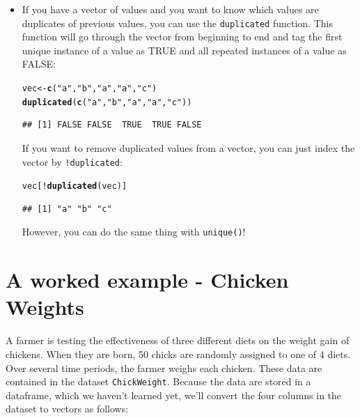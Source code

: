 \documentclass{tufte-book}\usepackage[]{graphicx}\usepackage[]{color}
\makeatletter
\newcommand{\hlstr}[1]{\textcolor[rgb]{0.192,0.494,0.8}{#1}}%
\newcommand{\hlopt}[1]{\textcolor[rgb]{0,0,0}{#1}}%
\newcommand{\hlstd}[1]{\textcolor[rgb]{0.345,0.345,0.345}{#1}}%
\newcommand{\hlkwb}[1]{\textcolor[rgb]{0.69,0.353,0.396}{#1}}%
\newcommand{\hlkwd}[1]{\textcolor[rgb]{0.737,0.353,0.396}{\textbf{#1}}}%
\newenvironment{kframe}{%
 \def\at@end@of@kframe{}%
 \ifinner\ifhmode%
  \def\at@end@of@kframe{\end{minipage}}%
  \begin{minipage}{\columnwidth}%
 \fi\fi%
 \def\FrameCommand##1{\hskip\@totalleftmargin \hskip-\fboxsep
 \colorbox{shadecolor}{##1}\hskip-\fboxsep
     \hskip-\linewidth \hskip-\@totalleftmargin \hskip\columnwidth}%
 \MakeFramed {\advance\hsize-\width
   \@totalleftmargin\z@ \linewidth\hsize
   \@setminipage}}%
 {\par\unskip\endMakeFramed%
 \at@end@of@kframe}
\newenvironment{knitrout}{}{} %
\makeatother
\begin{document}
\begin{itemize}

  \item If you have a vector of values and you want to know which values are duplicates of previous values, you can use the \texttt{duplicated} function. This function will go through the vector from beginning to end and tag the first unique instance of a value as TRUE and all repeated instances of a value as FALSE:

\begin{knitrout}
\color{fgcolor}\begin{kframe}
\begin{alltt}
\hlstd{vec} \hlkwb{<-} \hlkwd{c}\hlstd{(}\hlstr{"a"}\hlstd{,} \hlstr{"b"}\hlstd{,} \hlstr{"a"}\hlstd{,} \hlstr{"a"}\hlstd{,} \hlstr{"c"}\hlstd{)}
\hlkwd{duplicated}\hlstd{(}\hlkwd{c}\hlstd{(}\hlstr{"a"}\hlstd{,} \hlstr{"b"}\hlstd{,} \hlstr{"a"}\hlstd{,} \hlstr{"a"}\hlstd{,} \hlstr{"c"}\hlstd{))}
\end{alltt}
\begin{verbatim}
## [1] FALSE FALSE  TRUE  TRUE FALSE
\end{verbatim}
\end{kframe}
\end{knitrout}

If you want to remove duplicated values from a vector, you can just index the vector by \texttt{!duplicated}:

\begin{knitrout}
\color{fgcolor}\begin{kframe}
\begin{alltt}
\hlstd{vec[}\hlopt{!}\hlkwd{duplicated}\hlstd{(vec)]}
\end{alltt}
\begin{verbatim}
## [1] "a" "b" "c"
\end{verbatim}
\end{kframe}
\end{knitrout}

However, you can do the same thing with \texttt{unique()}!


\end{itemize}


\section{A worked example - Chicken Weights}

A farmer is testing the effectiveness of three different diets on the weight gain of chickens. When they are born, 50 chicks are randomly assigned to one of 4 diets. Over several time periods, the farmer weighs each chicken. These data are contained in the dataset \texttt{ChickWeight}. Because the data are stored in a dataframe, which we haven't learned yet, we'll convert the four columns in the dataset to vectors as follows:
\end{document}
